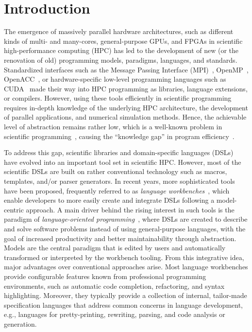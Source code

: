 \section{Introduction} The emergence of massively parallel hardware architectures, 
such as different kinds of multi- and many-cores, general-purpose GPUs, and FPGAs in
scientific high-performance computing (HPC) has led to the development of new (or the
renovation of old)  programming models, paradigms, languages, and standards.
Standardized interfaces such as the Message Passing Interface
(MPI)~\cite{MPI30}, OpenMP~\cite{openmp_standard},
OpenACC~\cite{openacc_standard}, or hardware-specific low-level programming languages
such as CUDA~\cite{cuda_standard} made their way into HPC programming as libraries,
language extensions, or compilers. However, using these tools efficiently in
scientific programming requires in-depth knowledge of the underlying HPC
architecture, the development of parallel applications, and numerical simulation
methods. Hence, the achievable level of abstraction remains rather low, which is a
well-known problem in scientific
programming~\cite{hannay_how_2009,wilson_wheres_2006}, causing the ``knowledge gap''
in program efficiency~\cite{Sbalzarini:2010}.

To address this gap, scientific libraries and domain-specific languages (DSLs)
have evolved into an important tool set in scientific HPC. However, most of the scientific DSLs are built on
rather conventional technology such as macros, templates, and/or parser generators. 
%
In recent years, more sophisticated tools have been proposed,
frequently referred to as \emph{language
workbenches}~\cite{fowler_language_workbenches_2005,erdweg_workbenches_2013}, which
enable developers to more easily create and integrate DSLs following a model-centric
approach. A main driver behind the rising interest in such tools is the paradigm of
\emph{language-oriented programming}~\cite{Ward1994}, where DSLs are created to
describe and solve software problems instead of using general-purpose languages, with
the goal of increased productivity and better maintainability through abstraction. 
%
Models are the central paradigm that is edited by users and automatically
transformed or interpreted by the workbench tooling. From this integrative idea,
major advantages over conventional approaches arise. Most language workbenches
provide configurable features known from professional programming environments, such
as automatic code completion, refactoring, and syntax highlighting.
Moreover, they typically provide a collection of internal, tailor-made specification
languages that address common concerns in language development, e.g., languages for
pretty-printing, rewriting, parsing, and code analysis or generation.


